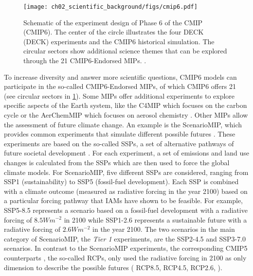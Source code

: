 \begin{figure}[t]
  \centering
  \texttt{[image: 
    ch02\_scientific\_background/figs/cmip6.pdf]}
  \caption{Schematic of the experiment design of Phase 6 of the \acl{CMIP}
    (\acs{CMIP}6). The center of the circle illustrates the four \acs{DECK}
    (\acl{DECK}) experiments and the \acs{CMIP}6 historical simulation. The
    circular sectors show additional science themes that can be explored
    through the 21 \acs{CMIP}6-Endorsed \acfp{MIP}.
    .}
  \label{fig:02:cmip6}
\end{figure}

To increase diversity and answer more scientific questions, \acs{CMIP}6 models
can participate in the so-called \acs{CMIP}6-Endorsed \acp{MIP}, of which
\acs{CMIP}6 offers 21 (see circular sectors in \cref{fig:02:cmip6}). Some
\acp{MIP} offer additional experiments to explore specific aspects of the Earth
system, like the \ac{C4MIP} which focuses on the carbon cycle
\autocite{Jones2016} or the \ac{AerChemMIP} which focuses on aerosol chemistry
\autocite{Collins2017}. Other \acp{MIP} allow the assessment of future climate
change. An example is the \ac{ScenarioMIP}, which provides common experiments
that simulate different possible futures \autocite{ONeill2016}. These
experiments are based on the so-called \acp{SSP}, a set of alternative pathways
of future societal development \autocite{ONeill2013, ONeill2017}. For each
experiment, a set of emissions and land use changes is calculated from the
\acp{SSP} \autocite{Riahi2017} which are then used to force the global climate
models. For \ac{ScenarioMIP}, five different \acp{SSP} are considered, ranging
from \acs{SSP}1 (sustainability) to \acs{SSP}5 (fossil-fuel development). Each
\ac{SSP} is combined with a climate outcome (measured as radiative forcing in
the year 2100) based on a particular forcing pathway that \acp{IAM} have shown
to be feasible. For example, \acs{SSP}5-8.5 represents a scenario based on a
fossil-fuel development with a radiative forcing of $8.5 \unit{W m^{-2}}$ in
2100 while \acs{SSP}1-2.6 represents a sustainable future with a radiative
forcing of $2.6 \unit{W m^{-2}}$ in the year 2100. The two scenarios in the
main category of \ac{ScenarioMIP}, the \emph{Tier 1} experiments, are the
\acs{SSP}2-4.5 and \acs{SSP}3-7.0 scenarios. In contrast to the
\ac{ScenarioMIP} experiments, the corresponding \acs{CMIP}5 counterparts
\autocite{Taylor2012}, the so-called \acp{RCP}, only used the radiative forcing
in 2100 as only dimension to describe the possible futures (\eg{} \acs{RCP}8.5,
\acs{RCP}4.5, \acs{RCP}2.6, \etc{}).

